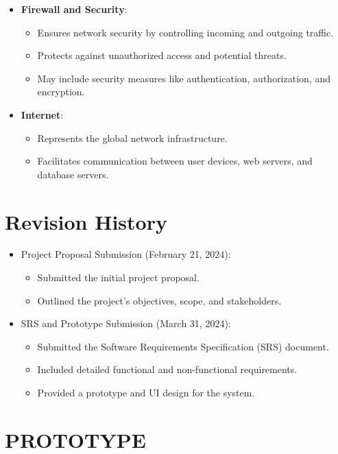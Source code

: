 \documentclass[a4paper, 12pt]{article}
\begin{document}
\begin{itemize}
    \item \textbf{Firewall and Security}:
    \begin{itemize}
        \item Ensures network security by controlling incoming and outgoing traffic.
        \item Protects against unauthorized access and potential threats.
        \item May include security measures like authentication, authorization, and encryption.
    \end{itemize}
    
    \item \textbf{Internet}:
    \begin{itemize}
        \item Represents the global network infrastructure.
        \item Facilitates communication between user devices, web servers, and database servers.
    \end{itemize}
\end{itemize}


\section{Revision History}
\begin{itemize}
    \item Project Proposal Submission (February 21, 2024):
    \begin{itemize}
        \item Submitted the initial project proposal.
        \item Outlined the project’s objectives, scope, and stakeholders.
    \end{itemize}
    
    \item SRS and Prototype Submission (March 31, 2024):
    \begin{itemize}
        \item Submitted the Software Requirements Specification (SRS) document.
        \item Included detailed functional and non-functional requirements.
        \item Provided a prototype and UI design for the system.
    \end{itemize}
\end{itemize}


\newpage
\section*{\centering PROTOTYPE}
\end{document}
